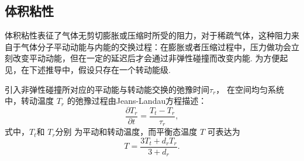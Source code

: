 \subsection{体积粘性}



体积粘性表征了气体无剪切膨胀或压缩时所受的阻力，对于稀疏气体，这种阻力来自于气体分子平动动能与内能的交换过程：在膨胀或者压缩过程中，压力做功会立刻改变平动动能，但在一定的延迟后才会通过非弹性碰撞而改变内能. 为方便起见，在下述推导中，假设只存在一个转动能级. 

引入非弹性碰撞所对应的平动能与转动能交换的弛豫时间$\tau_r$， 在空间均匀系统中，转动温度 $T_r$ 的弛豫过程由Jeans-Landau方程描述：
\begin{equation}\label{energy_relax_tr}
\frac{\partial{T_r}}{\partial t}=\frac{T_t-T_r}{\tau_r}, 
\end{equation} 
式中，$T_t$和 $T_r$分别 为平动和转动温度，而平衡态温度 $T$ 可表达为
\begin{equation}\label{TTrTt}
T=\frac{3T_t+d_rT_r}{3+d_r}.
\end{equation}

